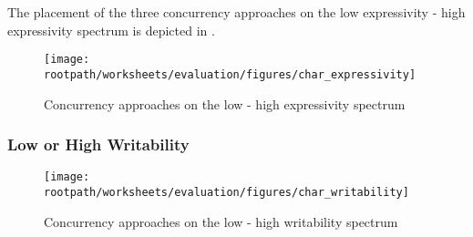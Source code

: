 The placement of the three concurrency approaches on the low expressivity - high expressivity spectrum is depicted in . 

\begin{figure}[htbp]
\centering
 \texttt{[image: \\rootpath/worksheets/evaluation/figures/char\_expressivity]} 
 \caption{Concurrency approaches on the low - high expressivity spectrum}
\label{fig:char_expressivity}
\end{figure}

\subsubsection{Low or High Writability}
\begin{figure}[htbp]
\centering
 \texttt{[image: \\rootpath/worksheets/evaluation/figures/char\_writability]} 
 \caption{Concurrency approaches on the low - high writability spectrum}
\label{fig:char_tl_writability}
\end{figure}

\worksheetend
